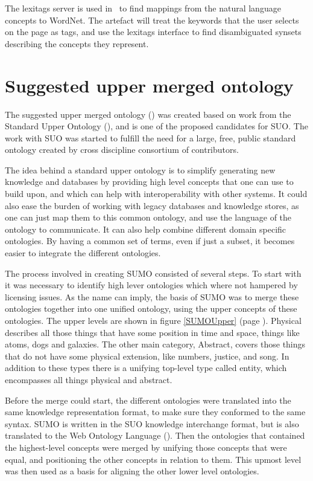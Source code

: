 The lexitags server is used in \theartefact\ to find mappings from the natural language concepts to WordNet.
The artefact will treat the keywords that the user selects on the page as tags,
and use the lexitags interface to find disambiguated synsets describing the concepts they represent.

\section{Suggested upper merged ontology}
The suggested upper merged ontology () was created based on work from the Standard Upper Ontology (),
and is one of the proposed candidates for SUO.
The work with SUO was started to fulfill the need for a large, free, public standard ontology
created by cross discipline consortium of contributors.

The idea behind a standard upper ontology is to simplify generating new knowledge and databases
by providing high level concepts that one can use to build upon,
and which can help with interoperability with other systems.
It could also ease the burden of working with legacy databases and knowledge stores,
as one can just map them to this common ontology, and use the language of the ontology to communicate.
It can also help combine different domain specific ontologies.
By having a common set of terms, even if just a subset,
it becomes easier to integrate the different ontologies\citep{Niles2001}.

The process involved in creating SUMO consisted of several steps.
To start with it was necessary to identify high lever ontologies which where not hampered by licensing issues.
As the name can imply, the basis of SUMO was to merge these ontologies together into one unified ontology,
using the upper concepts of these ontologies.
The upper levels are shown in figure \ref{SUMOUpper} (page \pageref{SUMOUpper}).
Physical describes all those things that have some position in time and space, things like atoms, dogs and galaxies.
The other main category, Abstract, covers those things that do not have some physical extension, like numbers,
justice, and song.
In addition to these types there is a unifying top-level type called entity, which encompasses all things physical and abstract.

Before the merge could start, the different ontologies were translated into the same knowledge representation format,
to make sure they conformed to the same syntax\citep{Niles2001}.
SUMO is written in the SUO knowledge interchange format,
but is also translated to the Web Ontology Language ()\citep{Benzmuller2012}.
Then the ontologies that contained the highest-level concepts were merged by unifying those concepts that were equal,
and positioning the other concepts in relation to them.
This upmost level was then used as a basis for aligning the other lower level ontologies\citep{Niles2001}.


